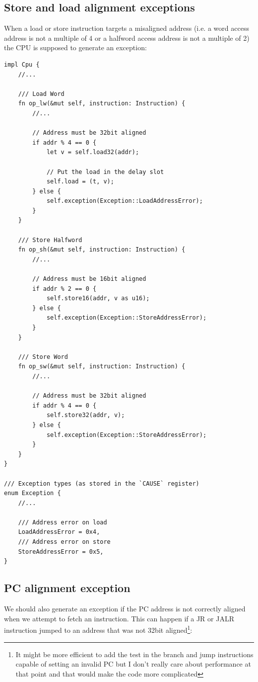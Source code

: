 \documentclass[a4paper]{article}
\begin{document}
\subsection{Store and load alignment exceptions}

When a load or store instruction targets a misaligned address (i.e. a
word access address is not a multiple of 4 or a halfword access
address is not a multiple of 2) the CPU is supposed to generate an
exception:

\begin{lstlisting}
impl Cpu {
    //...

    /// Load Word
    fn op_lw(&mut self, instruction: Instruction) {
        //...

        // Address must be 32bit aligned
        if addr % 4 == 0 {
            let v = self.load32(addr);

            // Put the load in the delay slot
            self.load = (t, v);
        } else {
            self.exception(Exception::LoadAddressError);
        }
    }

    /// Store Halfword
    fn op_sh(&mut self, instruction: Instruction) {
        //...

        // Address must be 16bit aligned
        if addr % 2 == 0 {
            self.store16(addr, v as u16);
        } else {
            self.exception(Exception::StoreAddressError);
        }
    }

    /// Store Word
    fn op_sw(&mut self, instruction: Instruction) {
        //...

        // Address must be 32bit aligned
        if addr % 4 == 0 {
            self.store32(addr, v);
        } else {
            self.exception(Exception::StoreAddressError);
        }
    }
}

/// Exception types (as stored in the `CAUSE` register)
enum Exception {
    //...

    /// Address error on load
    LoadAddressError = 0x4,
    /// Address error on store
    StoreAddressError = 0x5,
}
\end{lstlisting}

\subsection{PC alignment exception}

We should also generate an exception if the PC address is not
correctly aligned when we attempt to fetch an instruction. This can
happen if a JR or JALR instruction jumped to an address that was not
32bit aligned\footnote{It might be more efficient to add the test in
  the branch and jump instructions capable of setting an invalid PC
  but I don't really care about performance at that point and that
  would make the code more complicated}:
\end{document}
